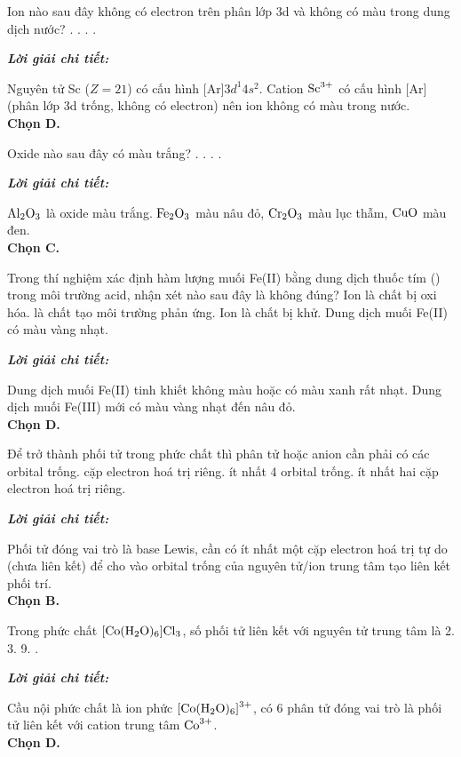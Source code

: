 \documentclass[11pt,a4paper]{article}
\def\loigiai#1{
\par\begingroup\color{blue!80!black}\small
\noindent\textbf{\textit{Lời giải chi tiết:}}\par
#1\par\endgroup}
\begin{document}
\begin{ex}
 Ion nào sau đây không có electron trên phân lớp 3d và không có màu trong dung dịch nước?
\choice
{.}
{.}
{.}
{\True {}.}
\loigiai{
Nguyên tử Sc ($Z=21$) có cấu hình $\text{[Ar]}3d^1 4s^2$. Cation $\ce{Sc^3+}$ có cấu hình $\text{[Ar]}$ (phân lớp 3d trống, không có electron) nên ion không có màu trong nước.\\
\textbf{Chọn D.}}
\end{ex}

\begin{ex}
 Oxide nào sau đây có màu trắng?
\choice
{.}
{.}
{\True {}.}
{.}
\loigiai{
$\ce{Al2O3}$ là oxide màu trắng. $\ce{Fe2O3}$ màu nâu đỏ, $\ce{Cr2O3}$ màu lục thẫm, $\ce{CuO}$ màu đen.\\
\textbf{Chọn C.}}
\end{ex}

\begin{ex}
 Trong thí nghiệm xác định hàm lượng muối Fe(II) bằng dung dịch thuốc tím () trong môi trường acid, nhận xét nào sau đây là không đúng?
\choice
{Ion  là chất bị oxi hóa.}
{ là chất tạo môi trường phản ứng.}
{Ion  là chất bị khử.}
{\True Dung dịch muối Fe(II) có màu vàng nhạt.}
\loigiai{
Dung dịch muối Fe(II) tinh khiết không màu hoặc có màu xanh rất nhạt. Dung dịch muối Fe(III) mới có màu vàng nhạt đến nâu đỏ.\\
\textbf{Chọn D.}}
\end{ex}

\begin{ex}
Để trở thành phối tử trong phức chất thì phân tử hoặc anion cần phải có
\choice
{các orbital trống.}
{\True cặp electron hoá trị riêng.}
{ít nhất 4 orbital trống.}
{ít nhất hai cặp electron hoá trị riêng.}
\loigiai{
Phối tử đóng vai trò là base Lewis, cần có ít nhất một cặp electron hoá trị tự do (chưa liên kết) để cho vào orbital trống của nguyên tử/ion trung tâm tạo liên kết phối trí.\\
\textbf{Chọn B.}}
\end{ex}

\begin{ex}
Trong phức chất $\ce{[Co(H2O)6]Cl3}$, số phối tử liên kết với nguyên tử trung tâm là
\choice
{2.}
{3.}
{9.}
{.}
\loigiai{
Cầu nội phức chất là ion phức $\ce{[Co(H2O)6]^3+}$, có 6 phân tử \ce{H2O} đóng vai trò là phối tử liên kết với cation trung tâm $\ce{Co^3+}$.\\
\textbf{Chọn D.}}
\end{ex}
\end{document}
